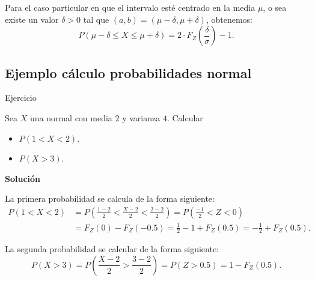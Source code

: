 \documentclass[
  letterpaper,
  DIV=11,
  numbers=noendperiod]{scrreprt}
\providecommand{\tightlist}{%
  \setlength{\itemsep}{0pt}\setlength{\parskip}{0pt}}\usepackage{longtable,booktabs,array}
\begin{document}
Para el caso particular en que el intervalo esté centrado en la media
\(\mu\), o sea existe un valor \(\delta>0\) tal que
\((a,b)=(\mu-\delta,\mu+\delta)\), obtenemos: \[
P\left(\mu-\delta\leq X \leq\mu+\delta\right)=2\cdot F_Z\left(\frac{\delta}{\sigma}\right)-1.
\]

\subsection{Ejemplo cálculo probabilidades
normal}\label{ejemplo-cuxe1lculo-probabilidades-normal}

\begin{Ejercicio}{Ejercicio}{}

Sea \(X\) una normal con media \(2\) y varianza \(4\). Calcular

\begin{itemize}
\tightlist
\item
  \(P(1< X< 2).\)
\item
  \(P(X>3).\)
\end{itemize}

\textbf{Solución}

La primera probabilidad se calcula de la forma siguiente: \[
\begin{array}{ll}
P(1< X< 2)&= P\left(\frac{1-2}{2}<\frac{X-2}{2}<\frac{2-2}{2}\right)= P\left(\frac{-1}{2}<Z<0\right)\\
&= F_{Z}(0)-F_{Z}(-0.5)=\frac12-1+F_{Z}(0.5)=-\frac12+F_Z(0.5).
\end{array}
\]

La segunda probabilidad se calcular de la forma siguiente: \[
P(X>3)=P\left(\frac{X-2}2>\frac{3-2}{2}\right)=P(Z>0.5)=1-F_{Z}(0.5).
\]

\end{Ejercicio}
\end{document}
